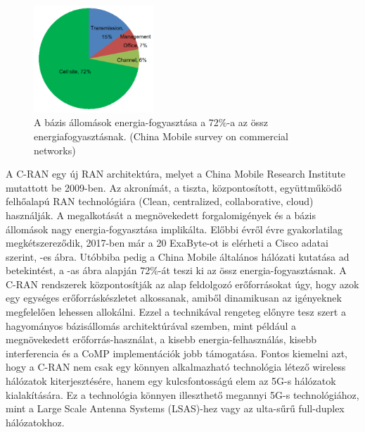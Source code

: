 \hspace{2mm}
\begin{figure}
\captionsetup{format=plain}
\includegraphics[width=0.4\textwidth, keepaspectratio]{figures/power_consumption.png}
\caption{A bázis állomások energia-fogyasztása a 72\%-a az össz energiafogyasztásnak. (China Mobile survey on commercial networks)}
\label{fig:power_consumption}
\vspace{-30pt}
\end{figure}
A C-RAN egy új RAN architektúra, melyet a China Mobile Research Institute mutattott be 2009-ben. Az akronímát, a tiszta, központosított, együttműködő felhőalapú RAN technológiára (Clean, centralized, collaborative, cloud) használják.\cite{RecentCRANProg}
A megalkotását a megnövekedett forgalomigények és a bázis állomások nagy energia-fogyasztása implikálta. Előbbi évről évre gyakorlatilag megkétszereződik, 2017-ben már a 20 ExaByte-ot is elérheti a Cisco adatai szerint, -es ábra. Utóbbiba pedig a China Mobile általános hálózati kutatása ad betekintést, a -as ábra alapján 72\%-át teszi ki az össz energia-fogyasztásnak.
A C-RAN rendszerek központosítják az alap feldolgozó erőforrásokat úgy, hogy azok egy egységes erőforráskészletet alkossanak, amiből dinamikusan az igényeknek megfelelően lehessen allokálni. Ezzel a technikával rengeteg előnyre tesz szert a hagyományos bázisállomás architektúrával szemben, mint például a megnövekedett erőforrás-használat, a kisebb energia-felhasználás, kisebb interferencia és a CoMP implementációk jobb támogatása. \cite{CoMP}
Fontos kiemelni azt, hogy a C-RAN nem csak egy könnyen alkalmazható technológia létező wireless hálózatok kiterjesztésére, hanem egy kulcsfontosságú elem az 5G-s hálózatok kialakítására.
Ez a technológia könnyen illeszthető megannyi 5G-s technológiához, mint a Large Scale Antenna Systems (LSAS)-hez vagy az ulta-sűrű full-duplex hálózatokhoz.\cite{TechOverview}

